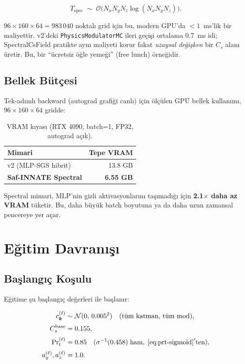 \begin{equation}
  T_{\mathrm{spec}} \;\sim\; \mathcal{O}\!\bigl(N_x N_y N_z \log(N_x N_y N_z)\bigr).
\end{equation}

$96\times 160\times 64 = 983\,040$ noktalı grid için bu, modern GPU'da
$<\!1$~ms'lik bir maliyettir. v2'deki \texttt{PhysicsModulatorMC} ileri
geçişi ortalama $0.7$~ms idi; SpectralCsField pratikte aynı maliyeti
korur fakat \emph{uzaysal değişken} bir $C_s$ alanı üretir. Bu, bir
``ücretsiz öğle yemeği'' (free lunch) örneğidir.

\subsection{Bellek Bütçesi}

Tek-adımlı backward (autograd grafiği canlı) için ölçülen GPU bellek
kullanımı, $96\times 160\times 64$ gridde:

\begin{table}[H]
\centering
\caption{VRAM kıyası (RTX 4090, batch=1, FP32, autograd açık).}
\label{tab:vram}
\begin{tabular}{lr}
\toprule
\textbf{Mimari} & \textbf{Tepe VRAM} \\
\midrule
v2 (MLP-SGS hibrit) & 13.8 GB \\
\textbf{Saf-INNATE Spectral}      & \textbf{6.55 GB} \\
\bottomrule
\end{tabular}
\end{table}

Spectral mimari, MLP'nin gizli aktivasyonlarını taşımadığı için
\textbf{2.1$\times$ daha az VRAM} tüketir. Bu, daha büyük batch
boyutuna ya da daha uzun zamansal pencereye yer açar.

\section{Eğitim Davranışı}
\label{sec:training-behavior}

\subsection{Başlangıç Koşulu}

Eğitime şu başlangıç değerleri ile başlanır:

\begin{align}
  c_{\bm{k}}^{(\ell)} &\sim \mathcal{N}(0,\,0.005^{2})
                          \quad (\text{tüm katman, tüm mod}), \\[2pt]
  C_s^{\mathrm{base}}   &= 0.155, \\[2pt]
  \mathrm{Pr}_t^{(\ell)}      &= 0.85
                          \quad (\sigma^{-1}(0.458)\;\text{ham},\;\eqref{eq:prt-sigmoid}'\text{ten}), \\[2pt]
  a_y^{(\ell)}, a_z^{(\ell)} &= 1.0.
\end{align}

